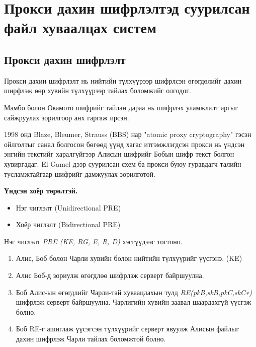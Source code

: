 
\chapter{Прокси дахин шифрлэлтэд суурилсан файл хуваалцах систем} %
\label{Chapter2} %
\pagecolor{white}

\section{Прокси дахин шифрлэлт}
Прокси дахин шифрлэлт нь нийтийн түлхүүрээр шифрлсэн өгөгдөлийг дахин ширфлэж өөр хувийн түлхүүрээр тайлах боломжийг олгодог.

Мамбо болон Окамото шифрийг тайлан дараа нь шифрлэх уламжлалт аргыг сайжруулах зорилгоор анх гаргаж ирсэн.

1998 онд Blaze, Bleumer, Strauss (BBS) нар "atomic proxy cryptography" гэсэн ойлголтыг санал болгосон бөгөөд үүнд хагас итгэмжлэгдсэн прокси нь үндсэн энгийн текстийг харалгүйгээр Алисын шифрийг Бобын шифр текст болгон хувиргадаг. El Gamel дээр суурилсан схем ба прокси буюу гуравдагч талийн тусламжтайгаар шифрийг дамжуулах зорилготой. 

\textbf{Үндсэн хоёр төрөлтэй.}
\begin{itemize}
    \item Нэг чиглэлт (Unidirectional PRE)
    \item Хоёр чиглэлт (Bidirectional PRE)
\end{itemize}

Нэг чиглэлт \emph{PRE (KE, RG, E, R, D)} хэсгүүдээс тогтоно.

\begin{enumerate}
    \item Алис, Боб болон Чарли хувийн болон нийтийн түлхүүрийг үүсгэнэ. (KE)
    \item Алис Боб-д зориулж өгөгдлөө шифрлэж серверт байршуулна.
    \item Боб Алис-ын өгөгдлийг Чарли-тай хуваацлахын тулд \emph{RE(pkB,skB,pkC,skC∗)} шифрлэж серверт байршуулна. Чарлигийн хувийн заавал шаардахгүй үүсгэж болно.
    \item Боб RE-г ашиглаж үүсэгсэн түлхүүрийг серверт явуулж Алисын файлыг дахин шифрлэж Чарли тайлах боломжтой болно.
\end{enumerate}


